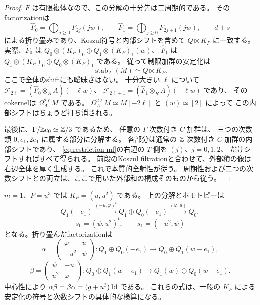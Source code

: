 \begin{proof}
 \(F\) は有限複体なので、この分解の十分先は二周期的である。
 そのfactorizationは
 \[
 \widehat F_0=\bigoplus_{j\ge0}F_{2j}(jw),\qquad
 \widehat F_1=\bigoplus_{j\ge0}F_{2j+1}(jw),
 \qquad d+s
 \]
 による折り畳みであり、Koszul符号と内部シフトを含めて
 \(Q\boxtimes K_P\) に一致する。
 実際、\(\widehat F_0\) は
 \(Q_0\otimes(K_P)_0\oplus Q_1\otimes(K_P)_1(w)\)、
 \(\widehat F_1\) は
 \(Q_1\otimes(K_P)_0\oplus Q_0\otimes(K_P)_1\) である。
 従って制限加群の安定化は
 \[
 \operatorname{stab}_A(M)\simeq Q\boxtimes K_P.               \tag{4g}\label{eq:restriction-mf}
 \]
 ここで全体のshiftにも曖昧さはない。
 十分大きい \(\ell\) について
 \(\mathcal F_{2\ell}=(\widehat F_0\otimes_R A)(-\ell w)\)、
 \(\mathcal F_{2\ell+1}=(\widehat F_1\otimes_R A)(-\ell w)\) であり、
 そのcokernelは \(\Omega_A^{2\ell}M\) である。
 \(\Omega_A^{2\ell}M\simeq M[-2\ell]\) と \((w)\simeq[2]\) によって
 この内部シフトはちょうど打ち消される。

 最後に、\(\Gamma/\mathbb Z e_0\simeq\mathbb Z/3\) であるため、
 任意の \(\Gamma\)-次数付き \(C\)-加群は、
 三つの次数類 \(0,e_1,2e_1\) に属する部分に分解する。
 各部分は通常の \(\mathbb Z\)-次数付き \(C\)-加群の内部シフトであり、
 \eqref{eq:restriction-mf}の右辺の \(T\) 側を \((j)\)、\(j=0,1,2\)、
 だけシフトすればすべて得られる。
 前段のKoszul filtrationと合わせて、外部積の像は右辺全体を厚く生成する。
 これで本質的全射性が従う。
 周期性および二つの次数シフトとの両立は、ここで用いた外部和の構成そのものから従う。
\end{proof}

\begin{remark}[一変数の場合の明示行列]\label{rem:central-one-variable}
 \(m=1\)、\(P=u^3\) では \(K_P=(u,u^2)\) である。
 上の分解とホモトピーは
 \[
 Q_1(-e_1)\xrightarrow{(-u,\varphi)^t}
 Q_1\oplus Q_0(-e_1)\xrightarrow{(\varphi,u)}Q_0,
 \]
 \[
 s_0=(\psi,u^2)^t,\qquad s_1=(-u^2,\psi)
 \]
 となる。折り畳んだfactorizationは
 \[
 \alpha=
 \begin{pmatrix}\varphi&u\\-u^2&\psi\end{pmatrix}:
 Q_1\oplus Q_0(-e_1)\longrightarrow Q_0\oplus Q_1(w-e_1),
 \]
 \[
 \beta=
 \begin{pmatrix}\psi&-u\\u^2&\varphi\end{pmatrix}:
 Q_0\oplus Q_1(w-e_1)\longrightarrow
 Q_1(w)\oplus Q_0(w-e_1).
 \]
 中心性により \(\alpha\beta=\beta\alpha=(g+u^3)\operatorname{Id}\) である。
 これらの式は、一般の \(K_P\) による安定化の符号と次数シフトの具体的な検算になる。
\end{remark}

